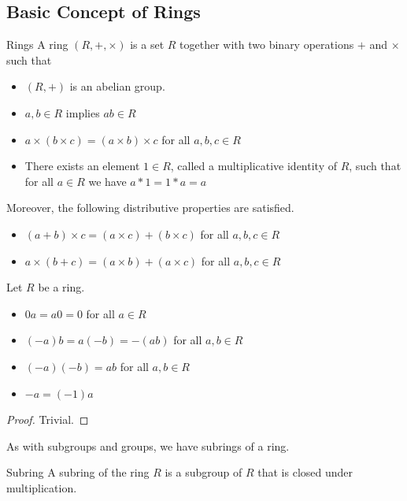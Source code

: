 \documentclass[a4paper]{article}
\begin{document}
\subsection{Basic Concept of Rings}
\begin{defn}{Rings}{} A ring $(R,+,\times)$ is a set $R$ together with two binary operations $+$ and $\times$ such that 
\begin{itemize}
\item $(R,+)$ is an abelian group. 
\item $a,b\in R$ implies $ab\in R$
\item $a\times(b\times c)=(a\times b)\times c$ for all $a,b,c\in R$
\item There exists an element $1\in R$, called a multiplicative identity of $R$, such that for all $a\in R$ we have $a*1=1*a=a$
\end{itemize}
Moreover, the following distributive properties are satisfied. 

\begin{itemize}
\item $(a+b)\times c=(a\times c)+(b\times c)$ for all $a,b,c\in R$
\item $a\times(b+c)=(a\times b)+(a\times c)$ for all $a,b,c\in R$
\end{itemize}
\end{defn}

\begin{prp}{}{} Let $R$ be a ring. 
\begin{itemize}
\item $0a=a0=0$ for all $a\in R$
\item $(-a)b=a(-b)=-(ab)$ for all $a,b\in R$
\item $(-a)(-b)=ab$ for all $a,b\in R$
\item $-a=(-1)a$
\end{itemize}\tcbline
\begin{proof}
Trivial. 
\end{proof}
\end{prp}

As with subgroups and groups, we have subrings of a ring. 

\begin{defn}{Subring}{} A subring of the ring $R$ is a subgroup of $R$ that is closed under multiplication. 
\end{defn}
\end{document}
